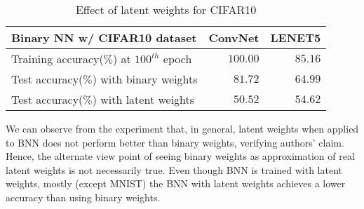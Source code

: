 \begin{table}[!ht]
  \caption{Effect of latent weights for CIFAR10}
  \label{CIFAR10latent}
  \centering
  \begin{tabular}{lrr}
    Binary NN w/ CIFAR10 dataset     & ConvNet     & LENET5 \\
    \midrule
    Training accuracy($\%$) at $100^{th}$ epoch &  $100.00$  & $85.16$     \\
    Test accuracy($\%$) with binary weights     & $81.72$ & $64.99$      \\
    Test accuracy($\%$) with latent weights     & $50.52$       & $54.62$  \\
    \bottomrule
  \end{tabular}
\end{table}

We can observe from the experiment that, in general, latent weights when applied to BNN does not perform better than binary weights, verifying authors' claim. Hence, the alternate view point of seeing binary weights as approximation of real latent weights \cite{courbariaux2015binaryconnect,courbariaux2016binarized, xnor_net, Zhuang2018} is not necessarily true. Even though BNN is trained with latent weights, mostly (except MNIST) the BNN with latent weights achieves a lower accuracy than using binary weights.